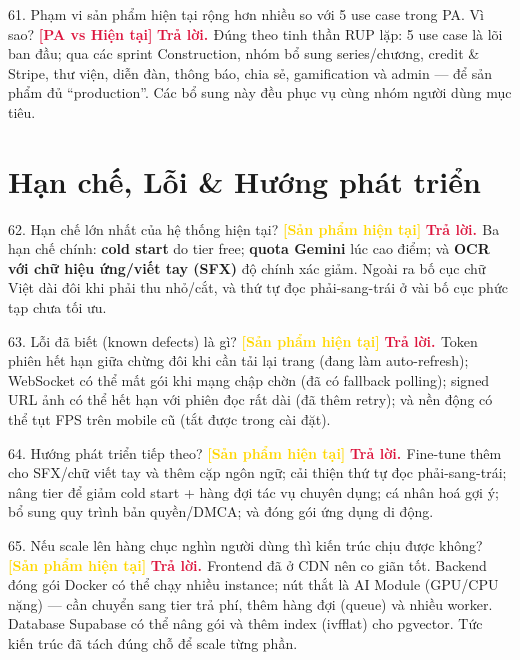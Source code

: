 \documentclass[11pt]{article}
\newcommand{\tagSP}{\textcolor{gold}{\footnotesize\textbf{[Sản phẩm hiện tại]}}}
\newcommand{\tagBoth}{\textcolor{crimson}{\footnotesize\textbf{[PA vs Hiện tại]}}}
\newcommand{\A}{\textbf{\textcolor{crimson}{Trả lời. }}}
\begin{document}
\begin{qa}{61. Phạm vi sản phẩm hiện tại rộng hơn nhiều so với 5 use case trong PA. Vì sao? \tagBoth}
\A Đúng theo tinh thần RUP lặp: 5 use case là lõi ban đầu; qua các sprint Construction, nhóm bổ sung series/chương, credit \& Stripe, thư viện, diễn đàn, thông báo, chia sẻ, gamification và admin --- để sản phẩm đủ ``production''. Các bổ sung này đều phục vụ cùng nhóm người dùng mục tiêu.
\end{qa}

\section{Hạn chế, Lỗi \& Hướng phát triển}

\begin{qa}{62. Hạn chế lớn nhất của hệ thống hiện tại? \tagSP}
\A Ba hạn chế chính: \textbf{cold start} do tier free; \textbf{quota Gemini} lúc cao điểm; và \textbf{OCR với chữ hiệu ứng/viết tay (SFX)} độ chính xác giảm. Ngoài ra bố cục chữ Việt dài đôi khi phải thu nhỏ/cắt, và thứ tự đọc phải-sang-trái ở vài bố cục phức tạp chưa tối ưu.
\end{qa}

\begin{qa}{63. Lỗi đã biết (known defects) là gì? \tagSP}
\A Token phiên hết hạn giữa chừng đôi khi cần tải lại trang (đang làm auto-refresh); WebSocket có thể mất gói khi mạng chập chờn (đã có fallback polling); signed URL ảnh có thể hết hạn với phiên đọc rất dài (đã thêm retry); và nền động có thể tụt FPS trên mobile cũ (tắt được trong cài đặt).
\end{qa}

\begin{qa}{64. Hướng phát triển tiếp theo? \tagSP}
\A Fine-tune thêm cho SFX/chữ viết tay và thêm cặp ngôn ngữ; cải thiện thứ tự đọc phải-sang-trái; nâng tier để giảm cold start + hàng đợi tác vụ chuyên dụng; cá nhân hoá gợi ý; bổ sung quy trình bản quyền/DMCA; và đóng gói ứng dụng di động.
\end{qa}

\begin{qa}{65. Nếu scale lên hàng chục nghìn người dùng thì kiến trúc chịu được không? \tagSP}
\A Frontend đã ở CDN nên co giãn tốt. Backend đóng gói Docker có thể chạy nhiều instance; nút thắt là AI Module (GPU/CPU nặng) --- cần chuyển sang tier trả phí, thêm hàng đợi (queue) và nhiều worker. Database Supabase có thể nâng gói và thêm index (ivfflat) cho pgvector. Tức kiến trúc đã tách đúng chỗ để scale từng phần.
\end{qa}
\end{document}
